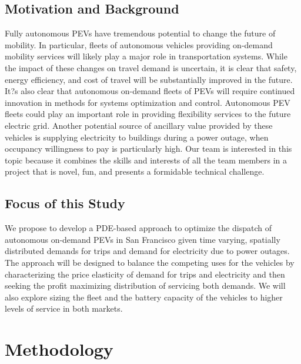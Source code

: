 \documentclass[journal]{IEEEtran}
\begin{document}
\subsection{Motivation and Background}
Fully autonomous PEVs have tremendous potential to change the future of mobility. In particular, fleets of autonomous vehicles providing on-demand mobility services will likely play a major role in transportation systems. While the impact of these changes on travel demand is uncertain, it is clear that safety, energy efficiency, and cost of travel will be substantially improved in the future. It?s also clear that autonomous on-demand fleets of PEVs will require continued innovation in methods for systems optimization and control.
Autonomous PEV fleets could play an important role in providing flexibility services to the future electric grid. Another potential source of ancillary value provided by these vehicles is supplying electricity to buildings during a power outage, when occupancy willingness to pay is particularly high. Our team is interested in this topic because it combines the skills and interests of all the team members in a project that is novel, fun, and presents a formidable technical challenge.
\subsection{Focus of this Study}
We propose to develop a PDE-based approach to optimize the dispatch of autonomous on-demand PEVs in San Francisco given time varying, spatially distributed demands for trips and demand for electricity due to power outages. The approach will be designed to balance the competing uses for the vehicles by characterizing the price elasticity of demand for trips and electricity and then seeking the profit maximizing distribution of servicing both demands. We will also explore sizing the fleet and the battery capacity of the vehicles to higher levels of service in both markets.

\section{Methodology}
\end{document}
